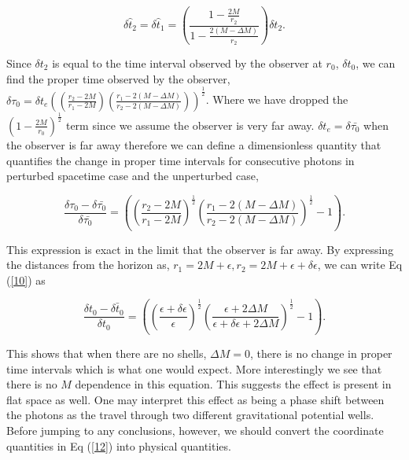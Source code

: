\documentclass[aps,showpacs,twocolumn,floats,prd,superscriptaddress,nofootinbib]{revtex4-1}
\begin{document}
\begin{equation}
	\delta \hat{t}_2 = \delta \hat{t}_1= \left( \frac{1 - \frac{2M}{r_2}}{1 - \frac{2(M- \Delta M)}{r_2}} \right) \delta t_2.	\label{7}
\end{equation}

Since $\delta t_2$ is equal to the time interval observed by the observer at $r_0$, $\delta t_0$, we can find the proper time observed by the observer, $\delta \tau_0  = \delta t_e \left( \left( \frac{r_2 - 2M}{r_1 - 2M} \right) \left( \frac{r_1 - 2(M-\Delta M)}{r_2 - 2(M - \Delta M)} \right) \right)^\frac{1}{2}$. Where we have dropped the $\left( 1 - \frac{2M}{r_0} \right)^\frac{1}{2}$ term since we assume the observer is very far away. $\delta t_e = \delta \bar{\tau_0}$ when the observer is far away therefore we can define a dimensionless quantity that quantifies the change in proper time intervals for consecutive photons in perturbed spacetime case and the unperturbed case, 

\begin{equation}
	 \frac{\delta \tau_0 - \delta \bar{\tau_0}}{\delta \bar{\tau_0}} = \left( \left( \frac{r_2 - 2M}{r_1 - 2M} \right)^\frac{1}{2} \left( \frac{r_1 - 2(M-\Delta M)}{r_2 - 2(M-\Delta M)} \right)^\frac{1}{2} - 1\right).	\label{10}
\end{equation}

This expression is exact in the limit that the observer is far away. By expressing the distances from the horizon as, $r_1  =  2M + \epsilon,  r_2  =  2M + \epsilon + \delta \epsilon$, we can write Eq (\ref{10}) as

\begin{equation}
	\frac{\delta t_0 - \bar{\delta t_0}}{\delta t_0} = \left( \left( \frac{\epsilon + \delta \epsilon}{\epsilon} \right)^\frac{1}{2} \left( \frac{\epsilon + 2 \Delta M}{\epsilon + \delta \epsilon + 2\Delta M} \right)^\frac{1}{2} - 1\right). \label{12}
\end{equation}

This shows that when there are no shells, $\Delta M = 0$, there is no change in proper time intervals which is what one would expect. More interestingly we see that there is no $M$ dependence in this equation. This suggests the effect is present in flat space as well. One may interpret this effect as being a phase shift between the photons as the travel through two different gravitational potential wells. Before jumping to any conclusions, however, we should convert the coordinate quantities in Eq (\ref{12}) into physical quantities. 
	
\end{document}
